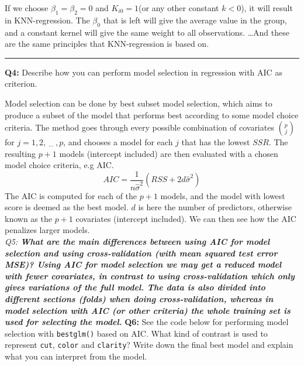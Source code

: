 \documentclass[]{article}
\newenvironment{Shaded}{\begin{snugshade}}{\end{snugshade}}
\newcommand{\KeywordTok}[1]{\textcolor[rgb]{0.13,0.29,0.53}{\textbf{#1}}}
\newcommand{\DataTypeTok}[1]{\textcolor[rgb]{0.13,0.29,0.53}{#1}}
\newcommand{\StringTok}[1]{\textcolor[rgb]{0.31,0.60,0.02}{#1}}
\newcommand{\CommentTok}[1]{\textcolor[rgb]{0.56,0.35,0.01}{\textit{#1}}}
\newcommand{\OtherTok}[1]{\textcolor[rgb]{0.56,0.35,0.01}{#1}}
\newcommand{\OperatorTok}[1]{\textcolor[rgb]{0.81,0.36,0.00}{\textbf{#1}}}
\newcommand{\NormalTok}[1]{#1}
\begin{document}
If we choose \(\beta_1=\beta_2 =0\) and \(K_{i0} = 1\)(or any other
constant \(k<0\)), it will result in KNN-regression. The \(\beta_0\)
that is left will give the average value in the group, and a constant
kernel will give the same weight to all observations. \ldots{}And these
are the same principles that KNN-regression is based on.

\begin{center}\rule{0.5\linewidth}{\linethickness}\end{center}

\textbf{Q4:} Describe how you can perform model selection in regression
with AIC as criterion.

Model selection can be done by best subset model selection, which aims
to produce a subset of the model that performs best according to some
model choice criteria. The method goes through every possible
combination of covariates \(p \choose j\) for
\(j = 1,2, \ _\cdots \ ,p\), and chooses a model for each \(j\) that has
the lowest \(SSR\). The resulting \(p+1\) models (intercept included)
are then evaluated with a chosen model choice criteria, e.g AIC. \[
AIC = \frac{1}{n\hat{\sigma}^2}(RSS+2d\hat{\sigma}^2)
\] The AIC is computed for each of the \(p+1\) models, and the model
with lowest score is deemed as the best model. \(d\) is here the number
of predictors, otherwise known as the \(p+1\) covariates (intercept
included). We can then see how the AIC penalizes larger models.\\
\emph{\textbf{ }Q5:\textbf{ What are the main differences between using
AIC for model selection and using cross-validation (with mean squared
test error MSE)? Using AIC for model selection we may get a reduced
model with fewer covariates, in contrast to using cross-validation which
only gives variations of the full model. The data is also divided into
different sections (folds) when doing cross-validation, whereas in model
selection with AIC (or other criteria) the whole training set is used
for selecting the model. }} \textbf{Q6:} See the code below for
performing model selection with \texttt{bestglm()} based on AIC. What
kind of contrast is used to represent \texttt{cut}, \texttt{color} and
\texttt{clarity}? Write down the final best model and explain what you
can interpret from the model.

\begin{Shaded}
\end{Shaded}
\end{document}
